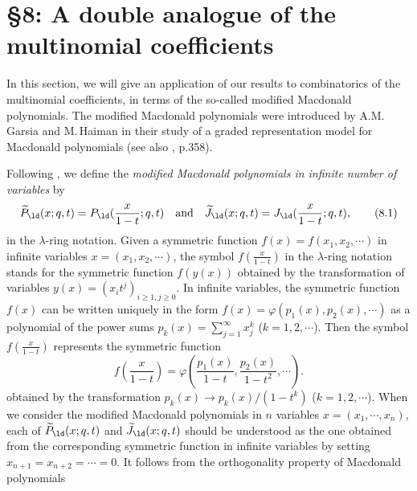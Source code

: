 \section{\S8:  A double analogue of the multinomial coefficients}
In this section, we will give an application of our results to combinatorics 
of the multinomial coefficients, in terms of the so-called 
modified Macdonald polynomials. 
The modified Macdonald polynomials were introduced by A.M.\,Garsia 
and M.\,Haiman \cite{GH} in their study of a graded representation 
model for Macdonald polynomials (see also \cite{Ma1}, p.358). 
\par\medpagebreak
Following \cite{GH},  we define the {\it modified Macdonald polynomials in
infinite number of variables} by
$$
\widetilde{P}_{\ld}(x;q,t)=P_\ld(\frac{x}{1-t};q,t)\quad \text{and} \quad
\widetilde{J}_{\ld}(x;q,t)=J_\ld(\frac{x}{1-t};q,t),
\tag{8.1}
$$
in the $\lambda$-ring notation. 
Given a symmetric function $f(x)=f(x_1,x_2,\cdots)$ in infinite variables
$x=(x_1,x_2,\cdots)$, 
the symbol $f(\frac{x}{1-t})$ in the $\lambda$-ring notation
stands for the symmetric function $f(y(x))$ obtained by  
the transformation of variables $y(x)=(x_it^j)_{i\ge 1, j\ge 0}$. 
In infinite variables, the symmetric function 
$f(x)$ can be written uniquely in the form $f(x)=\varphi(p_1(x),p_2(x),\cdots)$ 
as a polynomial of the power sums  
$p_k(x)=\sum_{j=1}^\infty x_j^k$ ($k=1,2,\cdots$).  
Then the symbol $f(\frac{x}{1-t})$ represents the symmetric function
$$
f(\frac{x}{1-t})=\varphi(\frac{p_1(x)}{1-t}, \frac{p_2(x)}{1-t^2},\cdots). 
\tag{8.2}
$$
obtained by the transformation $p_k(x) \to p_k(x)/(1-t^k)$
($k=1,2,\cdots$).
When we consider the modified Macdonald polynomials in $n$ variables 
$x=(x_1,\cdots,x_n)$, each of $\widetilde{P}_\ld(x;q,t)$ and 
$\widetilde{J}_\ld(x;q,t)$ should be understood as the one obtained from 
the corresponding symmetric function in infinite variables by setting 
$x_{n+1}=x_{n+2}=\cdots=0$. 
It follows from the orthogonality property of Macdonald polynomials
